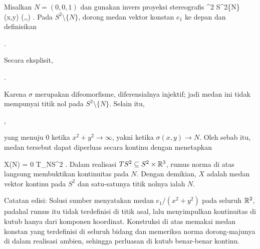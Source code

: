 Misalkan $N=(0,0,1)$ dan gunakan invers proyeksi stereografis
\maabbeledisp {\sigma} {\R^2} {S^2\setminus\{N\}
} {(x,y)} {\left(,,\right)
} {.}
Pada $S^2\setminus\{N\}$, dorong medan vektor konstan $e_1$ ke depan dan definisikan

 { . }

Secara eksplisit,

 { . }

Karena $\sigma$ merupakan difeomorfisme, diferensialnya injektif; jadi medan ini tidak mempunyai titik nol pada $S^2\setminus\{N\}$. Selain itu,

 { , }

yang menuju $0$ ketika $x^2+y^2\to\infty$, yakni ketika $\sigma(x,y)\to N$. Oleh sebab itu, medan tersebut dapat diperluas secara kontinu dengan menetapkan

\mavergleichskettedisp
{\vergleichskette
{X(N)
}
{ =} {0
}
{ \in }{T_NS^2
}
{ } {
}
{ } {
}
}
{}{}{.}
Dalam realisasi $TS^2\subseteq S^2\times{\mathbb R}^3$, rumus norma di atas langsung membuktikan kontinuitas pada $N$. Dengan demikian, $X$ adalah medan vektor kontinu pada $S^2$ dan satu-satunya titik nolnya ialah $N$.

Catatan edisi: Solusi sumber menyatakan medan $e_1/(x^2+y^2)$ pada seluruh ${\mathbb R}^2$, padahal rumus itu tidak terdefinisi di titik asal, lalu menyimpulkan kontinuitas di kutub hanya dari komponen koordinat. Konstruksi di atas memakai medan konstan yang terdefinisi di seluruh bidang dan memeriksa norma dorong-majunya di dalam realisasi ambien, sehingga perluasan di kutub benar-benar kontinu.
